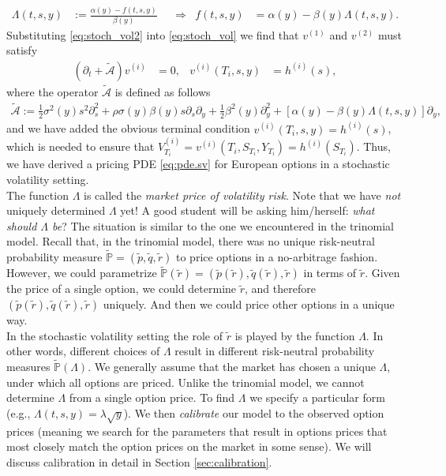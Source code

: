 \documentclass[12pt]{book}
\numberwithin{equation}{chapter}
\theoremstyle{plain}
\numberwithin{theorem}{section}
\theoremstyle{definition}
\numberwithin{exercise}{chapter}
\newcommand{\<}{\langle}
\renewcommand{\>}{\rangle}
\renewcommand{\(}{\left(}
\renewcommand{\)}{\right)}
\renewcommand{\[}{\left[}
\renewcommand{\]}{\right]}
\newcommand\Pb{\mathds{P}}
\newcommand\Ac{\mathscr{A}}
\newcommand\Lam{\Lambda}
\newcommand\Pbt{\widetilde{\Pb}}
\newcommand\Act{\widetilde{\Ac}}
\newcommand\qt{\widetilde{q}}
\newcommand\rt{\widetilde{r}}
\renewcommand\d{\partial}
\theoremstyle{definition}
\numberwithin{question}{section}
\newcommand\pt{\widetilde{p}}
\begin{document}
\begin{align} 
\Lambda (t,s,y)
	&:=	\frac{\alpha(y) - f(t,s,y)}{\beta(y)} &
	&\Rightarrow&
f(t,s,y) 
	&= \alpha(y) - \beta(y) \Lambda (t,s,y) . \label{eq:stoch_vol2}
\end{align}
Substituting \eqref{eq:stoch_vol2} into \eqref{eq:stoch_vol} we find that $v^{(1)}$ and $v^{(2)}$ must satisfy
\begin{align}	
(\d_t + \Act ) v^{(i)} 
	&= 0 , &
v^{(i)}(T_i,s,y)
		&=	h^{(i)}(s) , \label{eq:pde.sv}
\end{align}
where the operator $\Act$ is defined as follows
\begin{align}
\Act 
	:= \frac{1}{2} \sigma^2(y) s^2 \d_s^2 + \rho \sigma(y) \beta(y) s \d_s \d_y
			+ \frac{1}{2} \beta^2(y) \d_y^2 + \[ \alpha(y) - \beta(y) \Lambda(t,s,y) \] \d_y , \label{eq:A-tilde}
\end{align}
and we have added the obvious terminal condition $v^{(i)}(T_i,s,y)=h^{(i)}(s)$, which is needed to ensure that $V_{T_i}^{(i)} = v^{(i)}(T_i,S_{T_i},Y_{T_i}) = h^{(i)}(S_{T_i})$.  Thus, we have derived a pricing PDE \eqref{eq:pde.sv} for European options in a stochastic volatility setting.
\\[0.5em]
The function $\Lambda$ is called the \textit{market price of volatility risk}.  Note that we have \textit{not} uniquely determined $\Lambda$ yet!
A good student will be asking him/herself: \textit{what should $\Lambda$ be}?  The situation is similar to the one we encountered in the trinomial model. Recall that, in the trinomial model, there was no unique risk-neutral probability measure $\Pbt=(\pt, \qt, \rt)$ to price options in a no-arbitrage fashion.  
However, we could parametrize $\Pbt(\rt) = (\pt(\rt),\qt(\rt),\rt)$ in terms of $\rt$.
Given the price of a single option, we could determine $\rt$, and therefore $(\pt(\rt), \qt(\rt), \rt)$ uniquely.  And then we could price other options in a unique way.
\\[0.5em]
In the stochastic volatility setting the role of $\rt$ is played by the function $\Lam$.  In other words, different choices of $\Lam$ result in different risk-neutral probability measures $\Pbt(\Lam)$.  
We generally assume that the market has chosen a unique $\Lam$, under which all options are priced.
Unlike the trinomial model, we cannot determine $\Lam$ from a single option price.
To find $\Lambda$ we specify a particular form (e.g., $\Lambda(t,s,y) = \lambda \sqrt{y}$).  We then \textit{calibrate} our model to the observed option prices (meaning we search for the parameters that result in options prices that most closely match the option prices on the market in some sense).
We will discuss calibration in detail in Section \ref{sec:calibration}.
\end{document}
